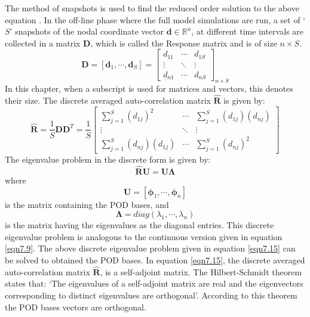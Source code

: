 \documentclass[10pt,letterpaper, onecolumn]{article}
\begin{document}
The method of snapshots is used to find the reduced order solution to the above equation \cite{ philipbook2012turbulence, kerschen2005method}. In the off-line phase where the full model simulations are run, a set of `$S$' snapshots of the nodal coordinate vector $\bm{d} \in \mathbb{R}^n$, at different time intervals are collected in a matrix $\bm{D}$, which is called the Response matrix and is of size $n \times S$.
% 
\begin{equation}
\bm{D} = [\bm{d}_1, \cdots, \bm{d}_S] = \begin{bmatrix} d_{11} & \cdots & d_{1S} \\
\vdots & \ddots & \vdots \\
d_{n1} & \cdots & d_{nS} \end{bmatrix}_{n \times S}
\end{equation}
%
In this chapter, when a subscript is used for matrices and vectors, this denotes their size. The discrete averaged auto-correlation matrix $\hat{\bm{R}}$ is given by:
%
\begin{equation}
\hat{\bm{R}} = \frac{1}{S} \bm{D} \bm{D}^T = \frac{1}{S} \begin{bmatrix} \sum^S_{j = 1} (d_{1j})^2 & \cdots & \sum^S_{j = 1} (d_{1j}) (d_{nj}) \\
\vdots & \ddots & \vdots \\
\sum^S_{j = 1} (d_{nj}) (d_{1j}) & \cdots &  \sum^S_{j = 1} (d_{nj})^2 \end{bmatrix}
\end{equation}
%
The eigenvalue problem in the discrete form is given by:
%
\begin{equation}
\hat{\bm{R}} \bm{U} =  \bm{U} \bm{\Lambda}
\label{eqn7.15}
\end{equation}
%
where 
\begin{equation}
\bm{U} = [\bm{\phi}_1, \cdots, \bm{\phi}_n]
\end{equation}
is the matrix containing the POD bases, and  
\begin{equation}
\bm{\Lambda} = diag(\lambda_1, \cdots, \lambda_n)
\end{equation}
is the matrix having the eigenvalues as the diagonal entries. This discrete eigenvalue problem is analogous to the continuous version given in equation \eqref{eqn7.9}. The above discrete eigenvalue problem given in equation \eqref{eqn7.15} can be solved to obtained the POD bases. In equation \eqref{eqn7.15}, the discrete averaged auto-correlation matrix $\hat{\bm{R}}$, is a self-adjoint matrix. The Hilbert-Schmidt theorem states that: `The eigenvalues of a self-adjoint matrix are real and the eigenvectors corresponding to distinct eigenvalues are orthogonal'. According to this theorem the POD bases vectors are orthogonal. 
\end{document}
